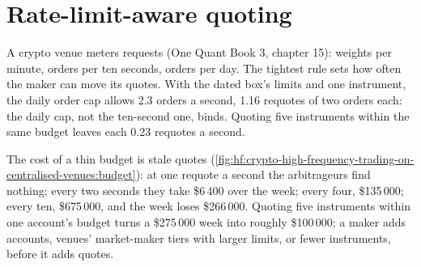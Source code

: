 \section{Rate-limit-aware quoting}

A crypto venue meters requests (One Quant Book 3, chapter 15): weights per minute, orders per ten seconds, orders per day. The tightest rule sets
how often the maker can move its quotes. With the dated box's limits and one instrument, the daily order cap allows 2.3 orders a second, 1.16
requotes of two orders each: the daily cap, not the ten-second one, binds. Quoting five instruments within the same budget leaves each 0.23 requotes a
second.

\begin{omfigure}

\label{fig:hf:crypto-high-frequency-trading-on-centralised-venues:budget}
\end{omfigure}

The cost of a thin budget is stale quotes (\cref{fig:hf:crypto-high-frequency-trading-on-centralised-venues:budget}): at one requote a second the
arbitrageurs find nothing; every two seconds they take \$6\,400 over the week; every four, \$135\,000; every ten, \$675\,000, and the week loses
\$266\,000. Quoting five instruments within one account's budget turns a \$275\,000 week into roughly \$100\,000; a maker adds accounts, venues'
market-maker tiers with larger limits, or fewer instruments, before it adds quotes.

